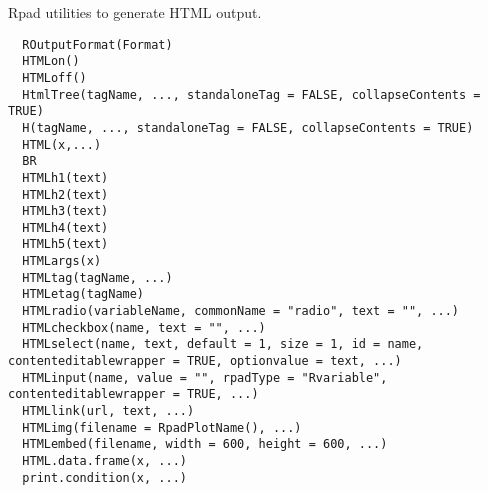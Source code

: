 \begin{Description}\relax
Rpad utilities to generate HTML output.
\end{Description}
\begin{Usage}
\begin{verbatim}
  ROutputFormat(Format)
  HTMLon()
  HTMLoff()
  HtmlTree(tagName, ..., standaloneTag = FALSE, collapseContents = TRUE)
  H(tagName, ..., standaloneTag = FALSE, collapseContents = TRUE)
  HTML(x,...)
  BR
  HTMLh1(text)
  HTMLh2(text)
  HTMLh3(text)
  HTMLh4(text)
  HTMLh5(text)
  HTMLargs(x)
  HTMLtag(tagName, ...)
  HTMLetag(tagName)
  HTMLradio(variableName, commonName = "radio", text = "", ...)
  HTMLcheckbox(name, text = "", ...)
  HTMLselect(name, text, default = 1, size = 1, id = name, contenteditablewrapper = TRUE, optionvalue = text, ...)
  HTMLinput(name, value = "", rpadType = "Rvariable", contenteditablewrapper = TRUE, ...)
  HTMLlink(url, text, ...)
  HTMLimg(filename = RpadPlotName(), ...)
  HTMLembed(filename, width = 600, height = 600, ...)
  HTML.data.frame(x, ...)
  print.condition(x, ...)
\end{verbatim}
\end{Usage}
